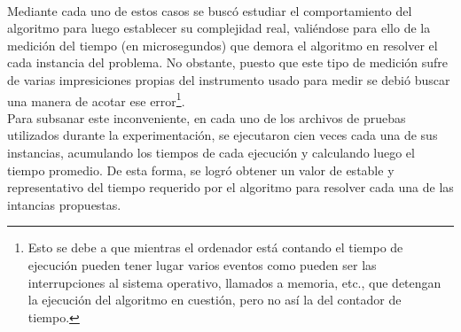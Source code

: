 \paragraph{}
Mediante cada uno de estos casos se buscó estudiar el comportamiento del algoritmo para luego establecer su complejidad real, valiéndose para ello de la medición del tiempo (en microsegundos) que demora el algoritmo en resolver el cada instancia del problema. 
No obstante, puesto que este tipo de medición sufre de varias impresiciones propias del instrumento usado para medir se debió buscar una manera de acotar ese error\footnote{Esto se debe a que mientras el ordenador está contando el tiempo de ejecución pueden tener lugar varios eventos como pueden ser las interrupciones al sistema operativo, llamados a memoria, etc., que detengan la ejecución del algoritmo en cuestión, pero no así la del contador de tiempo.}. \\
Para subsanar este inconveniente, en cada uno de los archivos de pruebas utilizados durante la experimentación, se ejecutaron cien veces cada una de sus instancias, acumulando los tiempos de cada ejecución y calculando luego el tiempo promedio. De esta forma, se logró obtener un valor de estable y representativo del tiempo requerido por el algoritmo para resolver cada una de las intancias propuestas.

